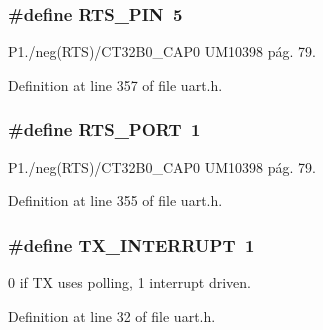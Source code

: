 \subsubsection[{\texorpdfstring{R\+T\+S\+\_\+\+P\+IN}{RTS_PIN}}]{\setlength{\rightskip}{0pt plus 5cm}\#define R\+T\+S\+\_\+\+P\+IN~5}\hypertarget{group___d_e_f_i_n_e_s_u_a_r_t_ga4a2c9474c826c040eb2f4d36fdf98509}{}\label{group___d_e_f_i_n_e_s_u_a_r_t_ga4a2c9474c826c040eb2f4d36fdf98509}


P1./neg(R\+TS)/\+C\+T32\+B0\+\_\+\+C\+A\+P0 U\+M10398 pág. 79. 



Definition at line 357 of file uart.\+h.

\subsubsection[{\texorpdfstring{R\+T\+S\+\_\+\+P\+O\+RT}{RTS_PORT}}]{\setlength{\rightskip}{0pt plus 5cm}\#define R\+T\+S\+\_\+\+P\+O\+RT~1}\hypertarget{group___d_e_f_i_n_e_s_u_a_r_t_ga7d503384123e41cba57ad7b306df19d8}{}\label{group___d_e_f_i_n_e_s_u_a_r_t_ga7d503384123e41cba57ad7b306df19d8}


P1./neg(R\+TS)/\+C\+T32\+B0\+\_\+\+C\+A\+P0 U\+M10398 pág. 79. 



Definition at line 355 of file uart.\+h.

\subsubsection[{\texorpdfstring{T\+X\+\_\+\+I\+N\+T\+E\+R\+R\+U\+PT}{TX_INTERRUPT}}]{\setlength{\rightskip}{0pt plus 5cm}\#define T\+X\+\_\+\+I\+N\+T\+E\+R\+R\+U\+PT~1}\hypertarget{group___d_e_f_i_n_e_s_u_a_r_t_ga8557658113e8a497db405dac37ca0c71}{}\label{group___d_e_f_i_n_e_s_u_a_r_t_ga8557658113e8a497db405dac37ca0c71}


0 if TX uses polling, 1 interrupt driven. 



Definition at line 32 of file uart.\+h.

